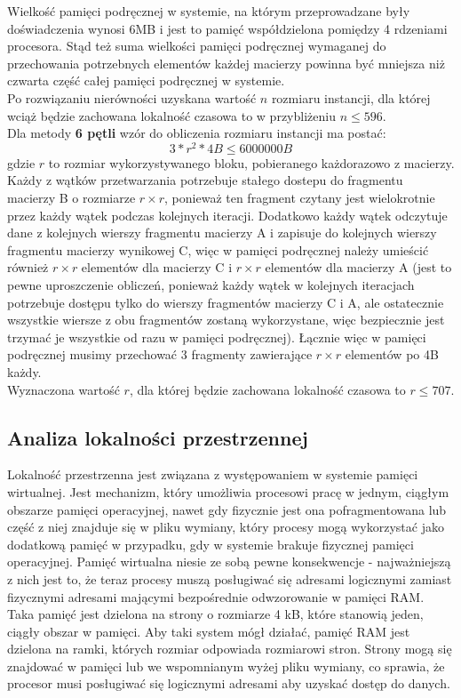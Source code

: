 \documentclass[10pt,a4paper]{article}
\begin{document}
Wielkość pamięci podręcznej w systemie, na którym przeprowadzane były doświadczenia wynosi 6MB i 
jest to pamięć współdzielona pomiędzy 4 rdzeniami procesora. Stąd też suma wielkości pamięci podręcznej 
wymaganej do przechowania potrzebnych elementów każdej macierzy powinna być mniejsza niż czwarta 
część całej pamięci podręcznej w systemie.\\
Po rozwiązaniu nierówności uzyskana wartość $n$ rozmiaru instancji, dla której wciąż będzie zachowana
lokalność czasowa to w przybliżeniu $n \leq 596$.\\

Dla metody \textbf{6 pętli} wzór do obliczenia rozmiaru instancji ma postać:
$$
3*r^2 * 4B \leq 6000000B
$$
gdzie $r$ to rozmiar wykorzystywanego bloku, pobieranego każdorazowo z macierzy.\\

Każdy z wątków przetwarzania potrzebuje stałego dostepu do fragmentu macierzy B o rozmiarze $r \times r$, ponieważ
ten fragment czytany jest wielokrotnie przez każdy wątek podczas kolejnych iteracji. Dodatkowo każdy wątek odczytuje 
dane z kolejnych wierszy fragmentu macierzy A i zapisuje do kolejnych wierszy fragmentu macierzy wynikowej C, 
więc w pamięci podręcznej należy umieścić również $r \times r$ elementów dla macierzy C i $r \times r$ elementów 
dla macierzy A (jest to pewne uproszczenie obliczeń, ponieważ każdy wątek w kolejnych iteracjach potrzebuje 
dostępu tylko do wierszy fragmentów macierzy C i A, ale ostatecznie wszystkie wiersze z obu fragmentów zostaną
wykorzystane, więc bezpiecznie jest trzymać je wszystkie od razu w pamięci podręcznej). Łącznie więc w pamięci 
podręcznej musimy przechować 3 fragmenty zawierające $r \times r$ elementów po 4B każdy.\\

Wyznaczona wartość $r$, dla której będzie zachowana lokalność czasowa to $r \leq 707$.

\subsection{Analiza lokalności przestrzennej}
Lokalność przestrzenna jest związana z występowaniem w systemie pamięci wirtualnej.
Jest mechanizm, który umożliwia procesowi pracę w jednym, ciągłym obszarze pamięci operacyjnej,
nawet gdy fizycznie jest ona pofragmentowana lub część z niej znajduje się w pliku wymiany,
który procesy mogą wykorzystać jako dodatkową pamięć w przypadku, gdy w systemie brakuje
fizycznej pamięci operacyjnej. Pamięć wirtualna niesie ze sobą pewne konsekwencje -
najważniejszą z nich jest to, że teraz procesy muszą posługiwać się adresami logicznymi
zamiast fizycznymi adresami mającymi bezpośrednie odwzorowanie w pamięci RAM.
Taka pamięć jest dzielona na strony o rozmiarze 4 kB, które stanowią jeden, ciągły obszar w pamięci.
Aby taki system mógł działać, pamięć RAM jest dzielona na ramki, których rozmiar odpowiada
rozmiarowi stron. Strony mogą się znajdować w pamięci lub we wspomnianym wyżej pliku wymiany,
co sprawia, że procesor musi posługiwać się logicznymi adresami aby uzyskać dostęp do danych.\\
\end{document}
